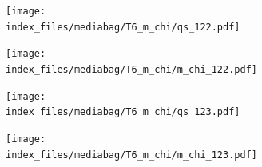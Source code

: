 \documentclass[
  11pt,
  letterpaper,
]{scrreprt}
\begin{document}
\begin{figure}

\begin{minipage}{0.50\linewidth}

\begin{figure}[H]

{\centering \texttt{[image: index\_files/mediabag/T6\_m\_chi/qs\_122.pdf]}

}


\end{figure}%

\end{minipage}%
%
\begin{minipage}{0.50\linewidth}

\begin{figure}[H]

{\centering \texttt{[image: index\_files/mediabag/T6\_m\_chi/m\_chi\_122.pdf]}

}


\end{figure}%

\end{minipage}%

\end{figure}%

\begin{figure}

\begin{minipage}{0.50\linewidth}

\begin{figure}[H]

{\centering \texttt{[image: index\_files/mediabag/T6\_m\_chi/qs\_123.pdf]}

}


\end{figure}%

\end{minipage}%
%
\begin{minipage}{0.50\linewidth}

\begin{figure}[H]

{\centering \texttt{[image: index\_files/mediabag/T6\_m\_chi/m\_chi\_123.pdf]}

}


\end{figure}%

\end{minipage}%

\end{figure}%
\end{document}
